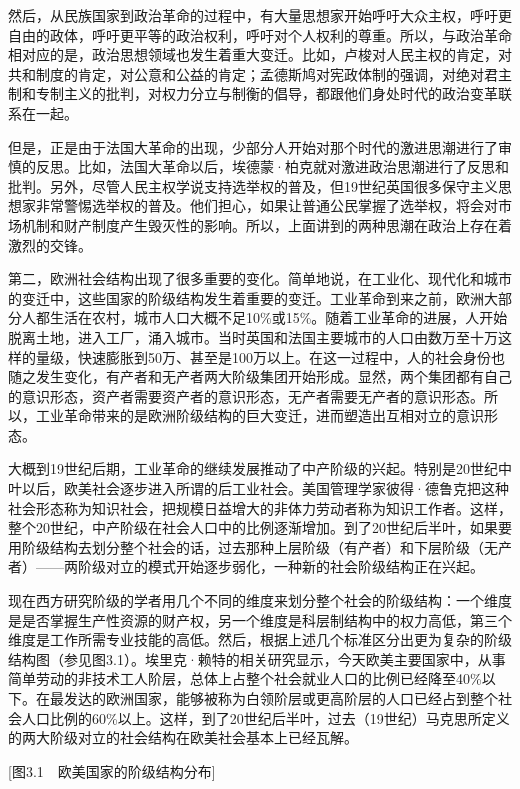 然后，从民族国家到政治革命的过程中，有大量思想家开始呼吁大众主权，呼吁更自由的政体，呼吁更平等的政治权利，呼吁对个人权利的尊重。所以，与政治革命相对应的是，政治思想领域也发生着重大变迁。比如，卢梭对人民主权的肯定，对共和制度的肯定，对公意和公益的肯定；孟德斯鸠对宪政体制的强调，对绝对君主制和专制主义的批判，对权力分立与制衡的倡导，都跟他们身处时代的政治变革联系在一起。

但是，正是由于法国大革命的出现，少部分人开始对那个时代的激进思潮进行了审慎的反思。比如，法国大革命以后，埃德蒙·柏克就对激进政治思潮进行了反思和批判。另外，尽管人民主权学说支持选举权的普及，但19世纪英国很多保守主义思想家非常警惕选举权的普及。他们担心，如果让普通公民掌握了选举权，将会对市场机制和财产制度产生毁灭性的影响。所以，上面讲到的两种思潮在政治上存在着激烈的交锋。

第二，欧洲社会结构出现了很多重要的变化。简单地说，在工业化、现代化和城市的变迁中，这些国家的阶级结构发生着重要的变迁。工业革命到来之前，欧洲大部分人都生活在农村，城市人口大概不足10\%或15\%。随着工业革命的进展，人开始脱离土地，进入工厂，涌入城市。当时英国和法国主要城市的人口由数万至十万这样的量级，快速膨胀到50万、甚至是100万以上。在这一过程中，人的社会身份也随之发生变化，有产者和无产者两大阶级集团开始形成。显然，两个集团都有自己的意识形态，资产者需要资产者的意识形态，无产者需要无产者的意识形态。所以，工业革命带来的是欧洲阶级结构的巨大变迁，进而塑造出互相对立的意识形态。

大概到19世纪后期，工业革命的继续发展推动了中产阶级的兴起。特别是20世纪中叶以后，欧美社会逐步进入所谓的后工业社会。美国管理学家彼得·德鲁克把这种社会形态称为知识社会，把规模日益增大的非体力劳动者称为知识工作者。这样，整个20世纪，中产阶级在社会人口中的比例逐渐增加。到了20世纪后半叶，如果要用阶级结构去划分整个社会的话，过去那种上层阶级（有产者）和下层阶级（无产者）——两阶级对立的模式开始逐步弱化，一种新的社会阶级结构正在兴起。

现在西方研究阶级的学者用几个不同的维度来划分整个社会的阶级结构：一个维度是是否掌握生产性资源的财产权，另一个维度是科层制结构中的权力高低，第三个维度是工作所需专业技能的高低。然后，根据上述几个标准区分出更为复杂的阶级结构图（参见图3.1）。埃里克·赖特的相关研究显示，今天欧美主要国家中，从事简单劳动的非技术工人阶层，总体上占整个社会就业人口的比例已经降至40\%以下。在最发达的欧洲国家，能够被称为白领阶层或更高阶层的人口已经占到整个社会人口比例的60\%以上。这样，到了20世纪后半叶，过去（19世纪）马克思所定义的两大阶级对立的社会结构在欧美社会基本上已经瓦解。

[图3.1　欧美国家的阶级结构分布]

